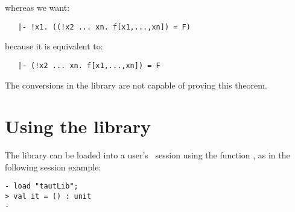 \noindent
whereas we want:

\begin{holboxed}\begin{verbatim}
   |- !x1. ((!x2 ... xn. f[x1,...,xn]) = F)
\end{verbatim}\end{holboxed}

\noindent
because it is equivalent to:

\begin{holboxed}\begin{verbatim}
   |- (!x2 ... xn. f[x1,...,xn]) = F
\end{verbatim}\end{holboxed}

\noindent
The conversions in the  library are not capable of proving this
theorem.


\section{Using the library}

The  library can be loaded into a user's \HOL\ session using the
function , as in the following session example:

\setcounter{sessioncount}{1}
\begin{session}\begin{verbatim}
- load "tautLib";
> val it = () : unit
-
\end{verbatim}\end{session}

